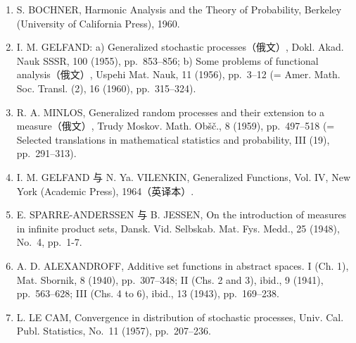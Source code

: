 \begin{enumerate}
\item
  S. BOCHNER, Harmonic Analysis and the Theory of Probability, Berkeley (University of California Press), 1960.
\item
  I. M. GELFAND: a) Generalized stochastic processes（俄文）, Dokl. Akad. Nauk SSSR, 100 (1955), pp.~853--856; b) Some problems of functional analysis（俄文）, Uspehi Mat. Nauk, 11 (1956), pp.~3--12 (= Amer. Math. Soc. Transl. (2), 16 (1960), pp.~315--324).
\item
  R. A. MINLOS, Generalized random processes and their extension to a measure（俄文）, Trudy Moskov. Math. Obšč., 8 (1959), pp.~497--518 (= Selected translations in mathematical statistics and probability, III (19), pp.~291--313).
\item
  I. M. GELFAND 与 N. Ya. VILENKIN, Generalized Functions, Vol. IV, New York (Academic Press), 1964（英译本）.
\item
  E. SPARRE-ANDERSSEN 与 B. JESSEN, On the introduction of measures in infinite product sets, Dansk. Vid. Selbskab. Mat. Fys. Medd., 25 (1948), No.~4, pp.~1-7.
\item
  A. D. ALEXANDROFF, Additive set functions in abstract spaces. I (Ch. 1), Mat. Sbornik, 8 (1940), pp.~307--348; II (Chs. 2 and 3), ibid., 9 (1941), pp.~563--628; III (Chs. 4 to 6), ibid., 13 (1943), pp.~169--238.
\item
  L. LE CAM, Convergence in distribution of stochastic processes, Univ. Cal. Publ. Statistics, No.~11 (1957), pp.~207--236.
\end{enumerate}

